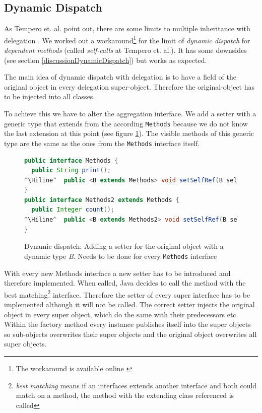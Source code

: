\documentclass{report}
\newcommand{\Hiline}{\makebox[0pt][l]{\color[rgb]{1,0.96,0.98}\rule[-4pt]{\linewidth}{12.5pt}}}
\begin{document}
\subsection{Dynamic Dispatch}

As Tempero et. al. point out, there are some limits to multiple inheritance with delegation \cite{Tempero-Multiple-2000}. We worked out a workaround\footnote{The workaround is available online \cite{Peuscher-GitHub-EP-2014}} for the limit of \emph{dynamic dispatch} for \emph{dependent methods} (called \emph{self-calls} at Tempero et. al.). It has some downsides (see section \ref{discussionDynamicDispatch}) but works as expected.

The main idea of dynamic dispatch with delegation is to have a field of the original object in every delegation super-object. Therefore the original-object has to be injected into all classes.

To achieve this we have to alter the aggregation interface. We add a setter with a generic type that extends from the according \lstinline{Methods} because we do not know the last extension at this point (see figure \ref{dynamicDispatchMethods}). The visible methods of this generic type are the same as the ones from the \lstinline{Methods} interface itself.

\begin{figure}[H]
\begin{lstlisting}[language=java]
public interface Methods {
  public String print();
^\Hiline^  public <B extends Methods> void setSelfRef(B selfRef);
}
public interface Methods2 extends Methods {
  public Integer count();
^\Hiline^  public <B extends Methods2> void setSelfRef(B selfRef);
}
\end{lstlisting}
\caption{Dynamic dispatch: Adding a setter for the original object with a dynamic type \emph{B}. Needs to be done for every \lstinline{Methods} interface}
\label{dynamicDispatchMethods}
\end{figure}

With every new Methods interface a new setter has to be introduced and therefore implemented. When called, Java decides to call the method with the best matching\footnote{\emph{best matching} means if an interfaces extends another interface and both could match on a method, the method with the extending class referenced is called} interface. Therefore the setter of every super interface has to be implemented although it will not be called. The correct setter injects the original object in every super object, which do the same with their predecessors etc. Within the factory method every instance publishes itself into the super objects so sub-objects overwrites their super objects and the original object overwrites all super objects.
\end{document}
